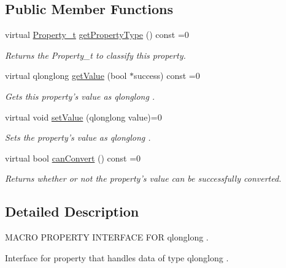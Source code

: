 \subsection*{Public Member Functions}
\begin{DoxyCompactItemize}
\item 
virtual \hyperlink{group___property_classes_ga38f1ccddda12c7cb50b868c9f789ee37}{Property\-\_\-t} \hyperlink{class_i_long_long_property_a799afb367a1ec4c8cf651d61abf782d6}{get\-Property\-Type} () const =0
\begin{DoxyCompactList}\small\item\em Returns the Property\-\_\-t to classify this property. \end{DoxyCompactList}\item 
virtual qlonglong \hyperlink{class_i_long_long_property_a4364152258a2b085fa660ae34d106fdf}{get\-Value} (bool $\ast$success) const =0
\begin{DoxyCompactList}\small\item\em Gets this property's value as qlonglong . \end{DoxyCompactList}\item 
virtual void \hyperlink{class_i_long_long_property_a3ef096db3b5d53b1566148d9c78fcbbf}{set\-Value} (qlonglong value)=0
\begin{DoxyCompactList}\small\item\em Sets the property's value as qlonglong . \end{DoxyCompactList}\item 
virtual bool \hyperlink{class_i_long_long_property_a878b7753e3c53e966f9be8a3bd1e9b38}{can\-Convert} () const =0
\begin{DoxyCompactList}\small\item\em Returns whether or not the property's value can be successfully converted. \end{DoxyCompactList}\end{DoxyCompactItemize}


\subsection{Detailed Description}
M\-A\-C\-R\-O P\-R\-O\-P\-E\-R\-T\-Y I\-N\-T\-E\-R\-F\-A\-C\-E F\-O\-R qlonglong . 

Interface for property that handles data of type qlonglong . 

